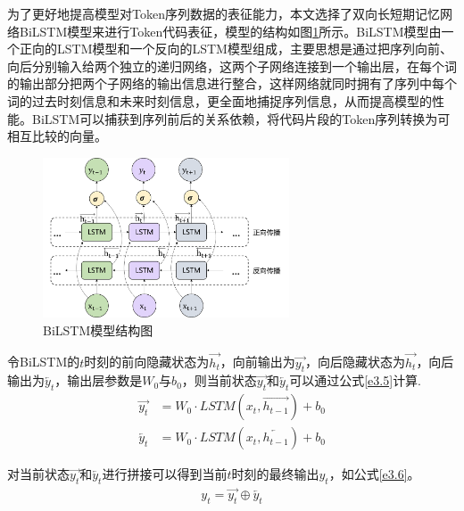 为了更好地提高模型对Token序列数据的表征能力，本文选择了双向长短期记忆网络BiLSTM模型来进行Token代码表征，模型的结构如图\ref{fig:BiLSTM}所示。BiLSTM模型由一个正向的LSTM模型和一个反向的LSTM模型组成，主要思想是通过把序列向前、向后分别输入给两个独立的递归网络，这两个子网络连接到一个输出层，在每个词的输出部分把两个子网络的输出信息进行整合，这样网络就同时拥有了序列中每个词的过去时刻信息和未来时刻信息，更全面地捕捉序列信息，从而提高模型的性能。BiLSTM可以捕获到序列前后的关系依赖，将代码片段的Token序列转换为可相互比较的向量。
\begin{figure}[H] 
  \centering
  \includegraphics[width=0.65\textwidth]{figures/BiLSTM}
  \caption{BiLSTM模型结构图}\label{fig:BiLSTM}
\end{figure}

令BiLSTM的$t$时刻的前向隐藏状态为$\overrightarrow{h_t}$，向前输出为$\overrightarrow{y_t}$，向后隐藏状态为$\overrightarrow{h_t}$，向后输出为$\overleftarrow{y_t}$，输出层参数是$W_0$与$b_0$，则当前状态$\overrightarrow{y_t}$和$\overleftarrow{y_t}$可以通过公式\ref{e3.5}计算.
\begin{equation}\label{e3.5}
  \begin{split}
    \overrightarrow{y_t} &= W_0 \cdot LSTM\left(x_{t},\overrightarrow{h_{t-1}}\right) + b_0
    \\
    \overleftarrow{y_t} &= W_0 \cdot LSTM\left(x_{t},\overleftarrow{h_{t-1}}\right) + b_0
  \end{split}
\end{equation}

对当前状态$\overrightarrow{y_t}$和$\overleftarrow{y_t}$进行拼接可以得到当前$t$时刻的最终输出$y_t$，如公式\ref{e3.6}。
\begin{equation}\label{e3.6}
  \begin{split}
    y_t = \overrightarrow{y_t} \oplus\overleftarrow{y_t}
  \end{split}
\end{equation}

